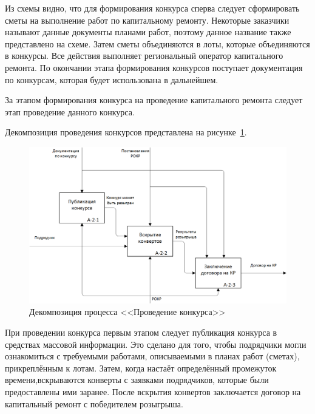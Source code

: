 Из схемы видно, что для формирования конкурса сперва следует сформировать сметы на выполнение работ по капитальному ремонту.
Некоторые заказчики называют данные документы планами работ, поэтому данное название также представлено на схеме.
Затем сметы объединяются в лоты, которые объединяются в конкурсы.
Все действия выполняет региональный оператор капитального ремонта.
По окончании этапа формирования конкурсов поступает документация по конкурсам, которая будет использована в дальнейшем.

За этапом формирования конкурса на проведение капитального ремонта следует этап проведение данного конкурса.

Декомпозиция проведения конкурсов представлена на рисунке~\ref{img:source-A2}.

\begin{figure}[h!]
	\begin{center}
		\begin{minipage}[h]{\linewidth}
			\centering
			\includegraphics[width=\linewidth]{images/source-A2.png}
			\caption{Декомпозиция процесса <<Проведение конкурса>>}
			\label{img:source-A2}
		\end{minipage}
		\hfill
	\end{center}
\end{figure}

При проведении конкурса первым этапом следует публикация конкурса в средствах массовой информации.
Это сделано для того, чтобы подрядчики могли ознакомиться с требуемыми работами, описываемыми в планах работ (сметах), прикреплённым к лотам.
Затем, когда настаёт определённый промежуток времени,\linebreak вскрываются конверты с заявками подрядчиков, которые были предоставлены ими заранее.
После вскрытия конвертов заключается договор на капитальный ремонт с победителем розыгрыша.

